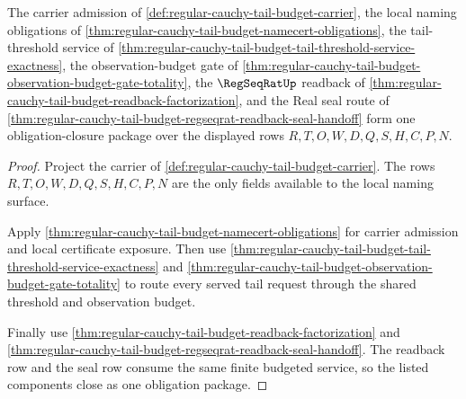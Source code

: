 \begin{theorem}
\label{thm:regularcauchytailbudget-obligation-closure-promoted}
The carrier admission of \autoref{def:regular-cauchy-tail-budget-carrier}, the local naming obligations of \autoref{thm:regular-cauchy-tail-budget-namecert-obligations}, the tail-threshold service of \autoref{thm:regular-cauchy-tail-budget-tail-threshold-service-exactness}, the observation-budget gate of \autoref{thm:regular-cauchy-tail-budget-observation-budget-gate-totality}, the $\RegSeqRatUp$ readback of \autoref{thm:regular-cauchy-tail-budget-readback-factorization}, and the Real seal route of \autoref{thm:regular-cauchy-tail-budget-regseqrat-readback-seal-handoff} form one obligation-closure package over the displayed rows $R,T,O,W,D,Q,S,H,C,P,N$.
\end{theorem}
\begin{proof}
Project the carrier of \autoref{def:regular-cauchy-tail-budget-carrier}. The rows $R,T,O,W,D,Q,S,H,C,P,N$ are the only fields available to the local naming surface.

Apply \autoref{thm:regular-cauchy-tail-budget-namecert-obligations} for carrier admission and local certificate exposure. Then use \autoref{thm:regular-cauchy-tail-budget-tail-threshold-service-exactness} and \autoref{thm:regular-cauchy-tail-budget-observation-budget-gate-totality} to route every served tail request through the shared threshold and observation budget.

Finally use \autoref{thm:regular-cauchy-tail-budget-readback-factorization} and \autoref{thm:regular-cauchy-tail-budget-regseqrat-readback-seal-handoff}. The readback row and the seal row consume the same finite budgeted service, so the listed components close as one obligation package.
\end{proof}

